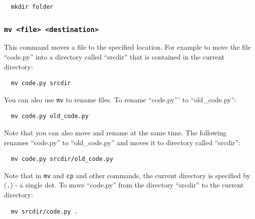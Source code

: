 \documentclass[10pt]{article}
\begin{document}
\begin{verbatim}
  mkdir folder
\end{verbatim}
	  
\subsubsection{\texttt{mv <file> <destination>}}
\noindent This command moves a file to the specified location.  For example to move the file ``code.py'' into a directory called ``srcdir'' that is contained in the current directory:

\begin{verbatim}
  mv code.py srcdir
\end{verbatim}

\noindent You can also use \texttt{mv} to rename files.  To rename ``code.py''' to ``old\_code.py'':
\begin{verbatim}
  mv code.py old_code.py
\end{verbatim}

\noindent Note that you can also move and rename at the same time.  The following renames ``code.py'' to ``old\_code.py'' and moves it to directory called ``srcdir'':
\begin{verbatim}
  mv code.py srcdir/old_code.py
\end{verbatim}

\noindent Note that in \texttt{mv} and \texttt{cp} and other commands, the current directory is specified by (\texttt{.}) - a single dot.  To move ``code.py'' from the directory ``srcdir'' to the current directory:
\begin{verbatim}
  mv srcdir/code.py .
\end{verbatim}  


\end{document}
